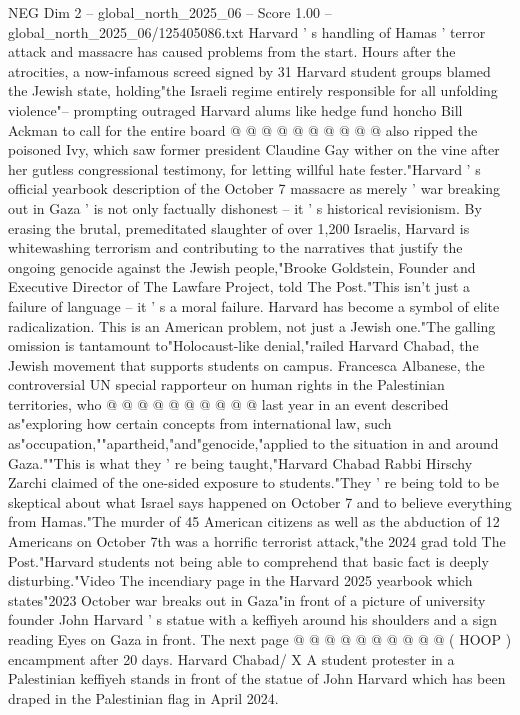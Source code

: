 \begin{textsample}{NEG Dim 2 – global\_north\_2025\_06 – Score 1.00 – global\_north\_2025\_06/125405086.txt}
Harvard ' s handling of Hamas ' terror attack and massacre has caused problems from the start.
Hours after the atrocities, a now-infamous screed signed by 31 Harvard student groups blamed the Jewish state, holding"the Israeli regime entirely responsible for all unfolding violence"-- prompting outraged Harvard alums like hedge fund honcho Bill Ackman to call for the entire board @ @ @ @ @ @ @ @ @ @ also ripped the poisoned Ivy, which saw former president Claudine Gay wither on the vine after her gutless congressional testimony, for letting willful hate fester."Harvard ' s official yearbook description of the October 7 massacre as merely ' war breaking out in Gaza ' is not only factually dishonest -- it ' s historical revisionism.
By erasing the brutal, premeditated slaughter of over 1,200 Israelis, Harvard is whitewashing terrorism and contributing to the narratives that justify the ongoing genocide against the Jewish people,"Brooke Goldstein, Founder and Executive Director of The Lawfare Project, told The Post."This isn't just a failure of language -- it ' s a moral failure.
Harvard has become a symbol of elite radicalization.
This is an American problem, not just a Jewish one."The galling omission is tantamount to"Holocaust-like denial,"railed Harvard Chabad, the Jewish movement that supports students on campus.
Francesca Albanese, the controversial UN special rapporteur on human rights in the Palestinian territories, who @ @ @ @ @ @ @ @ @ @ last year in an event described as"exploring how certain concepts from international law, such as"occupation,""apartheid,"and"genocide,"applied to the situation in and around Gaza.""This is what they ' re being taught,"Harvard Chabad Rabbi Hirschy Zarchi claimed of the one-sided exposure to students."They ' re being told to be skeptical about what Israel says happened on October 7 and to believe everything from Hamas."The murder of 45 American citizens as well as the abduction of 12 Americans on October 7th was a horrific terrorist attack,"the 2024 grad told The Post."Harvard students not being able to comprehend that basic fact is deeply disturbing."Video The incendiary page in the Harvard 2025 yearbook which states"2023 October war breaks out in Gaza"in front of a picture of university founder John Harvard ' s statue with a keffiyeh around his shoulders and a sign reading Eyes on Gaza in front.
The next page @ @ @ @ @ @ @ @ @ @ ( HOOP ) encampment after 20 days.
Harvard Chabad/ X A student protester in a Palestinian keffiyeh stands in front of the statue of John Harvard which has been draped in the Palestinian flag in April 2024.

\end{textsample}
